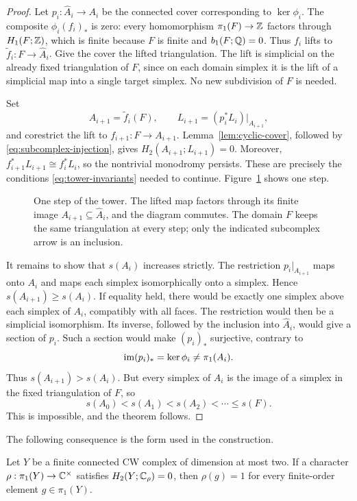 \begin{proof}
Let $p_i:\widehat A_i\to A_i$ be the connected cover corresponding to
$\ker\phi_i$.  The composite $\phi_i(f_i)_*$ is zero: every
homomorphism $\pi_1(F)\to\mathbb Z$ factors through $H_1(F;\mathbb Z)$, which is
finite because $F$ is finite and $b_1(F;\mathbb Q)=0$.
Thus $f_i$ lifts to $\widetilde f_i:F\to\widehat A_i$.
Give the cover the lifted triangulation.  The lift is simplicial on
the already fixed triangulation of $F$, since on each domain simplex
it is the lift of a simplicial map into a single target simplex.
No new subdivision of $F$ is needed.

Set
\[
  A_{i+1}=\widetilde f_i(F),
  \qquad L_{i+1}=(p_i^*L_i)|_{A_{i+1}},
\]
and corestrict the lift to $f_{i+1}:F\to A_{i+1}$.
Lemma~\ref{lem:cyclic-cover}, followed by
\eqref{eq:subcomplex-injection}, gives
$H_2(A_{i+1};L_{i+1})=0$.  Moreover,
$f_{i+1}^*L_{i+1}\cong f_i^*L_i$, so the nontrivial monodromy
persists.  These are precisely the conditions
\eqref{eq:tower-invariants} needed to continue.  Figure~\ref{fig:tower}
shows one step.

\begin{figure}[tb]
  \centering
  
  \caption{One step of the tower.  The lifted map factors through its
  finite image $A_{i+1}\subseteq\widehat A_i$, and the diagram commutes.
  The domain $F$ keeps the same triangulation at every step; only the
  indicated subcomplex arrow is an inclusion.}
  \label{fig:tower}
\end{figure}

It remains to show that $s(A_i)$ increases strictly.  The restriction
$p_i|_{A_{i+1}}$ maps onto $A_i$ and maps each
simplex isomorphically onto a simplex.  Hence
$s(A_{i+1})\geq s(A_i)$.  If equality held, there would be exactly
one simplex above each simplex of $A_i$, compatibly with all faces.
The restriction would then be a simplicial isomorphism.  Its inverse,
followed by the inclusion into $\widehat A_i$, would give a section
of $p_i$.  Such a section would make $(p_i)_*$ surjective, contrary
to
\[
  \operatorname{im}(p_i)_*=\ker\phi_i\ne\pi_1(A_i).
\]
Thus $s(A_{i+1})>s(A_i)$.  But every simplex of $A_i$ is the image
of a simplex in the fixed triangulation of $F$, so
\[
  s(A_0)<s(A_1)<s(A_2)<\cdots\leq s(F).
\]
This is impossible, and the theorem follows.
\end{proof}

The following consequence is the form used in the construction.

\begin{corollary}
\label{cor:torsion}
Let $Y$ be a finite connected CW complex of dimension at most two.
If a character $\rho:\pi_1(Y)\to\mathbb C^\times$ satisfies
$H_2(Y;\mathbb C_\rho)=0$, then $\rho(g)=1$ for every finite-order
element $g\in\pi_1(Y)$.
\end{corollary}

